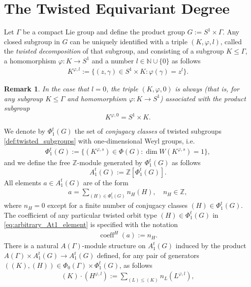 \documentclass[twoside,11pt]{article}
\def\bn{{\mathbb{N}}}
\def\bz{{\mathbb{Z}}}
\newtheorem{remark}[theorem]{Remark}
\begin{document}
\section{The Twisted Equivariant Degree} \label{sec:appendix_twisted_deg}
Let $\Gamma$ be a compact Lie group and define the product group $G:= S^1 \times \Gamma$. Any closed subgroup in $G$ can be uniquely identified with a triple $(K,\varphi,l)$, called the {\it twisted decomposition} of that subgroup, and consisting of a subgroup $K \leq \Gamma$, a homomorphism $\varphi: K \rightarrow S^1$ and a number $l \in \bn \cup \{0\}$ as follows
\begin{align} \label{def:twisted_subgroups}
 K^{\varphi,l} := \{(z,\gamma) \in S^1 \times K: \varphi(\gamma) = z^l \}.
\end{align}
\begin{remark} \rm
In the case that $l = 0$, the triple $(K,\varphi,0)$ is always (that is, for any subgroup $K \leq \Gamma$ and homomorphism $\varphi: K \rightarrow S^1$) associated with
the {\it product subgroup}
\[
K^{\varphi,0} = S^1 \times K.
\]
\end{remark}
We denote by $\Phi_1^t(G)$ the set of {\it conjugacy classes} of twisted subgroups \eqref{def:twisted_subgroups} with one-dimensional Weyl groups, i.e.
\begin{align} \label{def:twisted_subgroup_conjugacy_classes}
\Phi_1^t(G) := \{ (K^{\varphi,s}) \in \Phi(G) : \dim W(K^{\varphi,s}) =1 \},
\end{align}
and we define the free $\bz$-module generated by $\Phi_1^t(G)$ as follows
\[
A^t_1(G) := \bz[\Phi_1^t(G)].
\]
All elements $a \in A^t_1(G)$ are of the form
\begin{align}\label{eq:arbitrary_At1_element}
  a = \sum\limits_{(H) \in \Phi_1^t(G)} n_H(H),  \quad n_H \in \bz, 
\end{align}
where $n_H = 0$ except for a finite number of conjugacy classes $(H) \in  \Phi_1^t(G)$. The coefficient of any particular twisted orbit type $(H) \in \Phi_1^t(G)$ in \eqref{eq:arbitrary_At1_element} is specified with the notation
\begin{align} \label{def:coefficient_operator_notation}
\operatorname{coeff}^H(a) := n_H.   
\end{align}
There is a natural $A(\Gamma)$-module structure on $A^t_1(G)$ induced by the product $A(\Gamma) \times A^t_1(G) \rightarrow A^t_1(G)$ defined, for any pair of generators $((K),(H)) \in \Phi_0(\Gamma) \times \Phi_1^t(G)$, as follows
\begin{align} \label{def:module_product}
(K) \cdot (H^{\varphi,l}) := \sum\limits_{(L) \leq (K)} n_L (L^{\varphi,l}),
\end{align}
\end{document}
